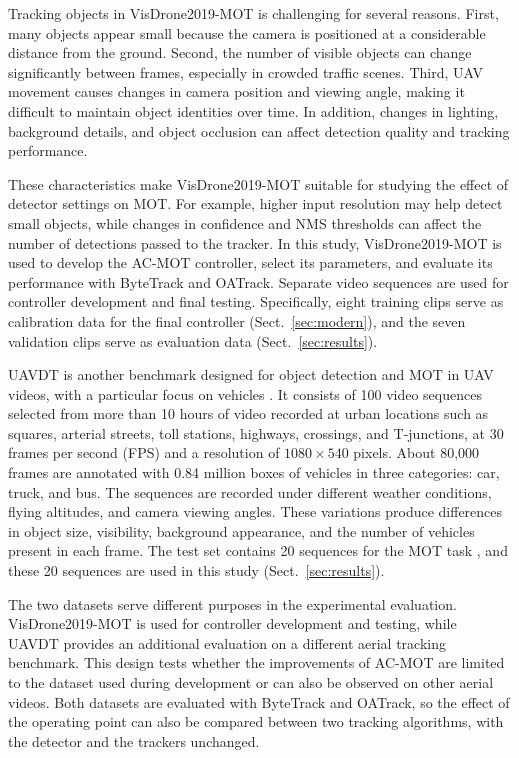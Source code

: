 \documentclass[pdflatex,sn-mathphys-num,iicol]{sn-jnl}
\makeatletter
\def\subsubsectionfont{\reset@font\fontsize{9bp}{11bp}\bfseries\selectfont\raggedright\boldmath}
\renewcommand\subsubsection{\@startsection{subsubsection}{3}{\z@}{-6pt \@plus -2pt \@minus -2pt}{2pt}{\subsubsectionfont}}
\makeatother
\begin{document}
Tracking objects in VisDrone2019-MOT is challenging for several reasons. First, many objects appear small because the camera is positioned at a considerable distance from the ground. Second, the number of visible objects can change significantly between frames, especially in crowded traffic scenes. Third, UAV movement causes changes in camera position and viewing angle, making it difficult to maintain object identities over time. In addition, changes in lighting, background details, and object occlusion can affect detection quality and tracking performance.

These characteristics make VisDrone2019-MOT suitable for studying the effect of detector settings on MOT. For example, higher input resolution may help detect small objects, while changes in confidence and NMS thresholds can affect the number of detections passed to the tracker. In this study, VisDrone2019-MOT is used to develop the AC-MOT controller, select its parameters, and evaluate its performance with ByteTrack and OATrack. Separate video sequences are used for controller development and final testing. Specifically, eight training clips
serve as calibration data for the final controller (Sect.~\ref{sec:modern}),
and the seven validation clips serve as evaluation data
(Sect.~\ref{sec:results}).

\subsubsection{UAVDT}
UAVDT is another benchmark designed for object detection and MOT in UAV
videos, with a particular focus on vehicles \cite{du2018uavdt}.
It consists of 100 video sequences selected from more than 10 hours of video
recorded at urban locations such as squares, arterial streets, toll stations,
highways, crossings, and T-junctions, at 30 frames per second (FPS) and a resolution
of $1080\times540$ pixels. About 80,000 frames are annotated with 0.84 million
boxes of vehicles in three categories: car, truck, and bus. The sequences are
recorded under different weather conditions, flying altitudes, and camera
viewing angles. These variations produce differences in object size,
visibility, background appearance, and the number of vehicles present in each
frame. The test set contains 20 sequences for the MOT task
\cite{du2018uavdt}, and these 20 sequences are used in this study
(Sect.~\ref{sec:results}).

The two datasets serve different purposes in the experimental evaluation. VisDrone2019-MOT is used for controller development and testing, while UAVDT provides an additional evaluation on a different aerial tracking benchmark. This design tests whether the improvements of AC-MOT are limited to the dataset used during development or can also be observed on other aerial videos. Both datasets are evaluated with ByteTrack and OATrack, so the effect of the operating point can also be compared between two tracking algorithms, with the detector and the trackers unchanged.
\end{document}
